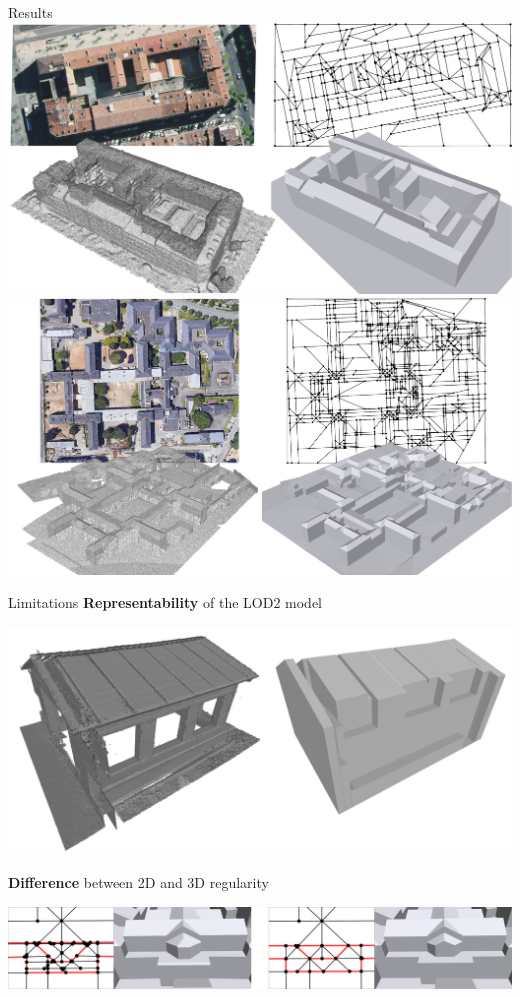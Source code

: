 \begin{frame}[c]{Results}
	\includegraphics[width=0.5\linewidth]{bb_v2}%
	\includegraphics[width=0.5\linewidth]{hoteldieu_v3}
\end{frame}

\begin{frame}{Limitations}
	\small
	\textbf{Representability} of the LOD2 model
	\begin{center}
		\includegraphics[width=0.6\linewidth]{failure_case}
	\end{center}

	\textbf{Difference} between 2D and 3D regularity
	\begin{center}
		\includegraphics[width=0.8\linewidth]{closeup_v2}
	\end{center}
\end{frame}

